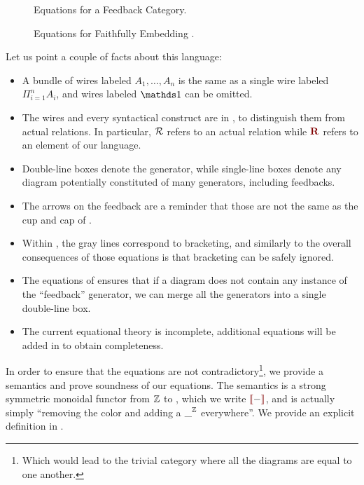 \begin{figure*}[h]
	\caption{Equations for a Feedback Category.}
	\label{appfig:graph-feedback-inf}
\end{figure*}

\begin{figure*}[h]
	\caption{Equations for Faithfully Embedding .}
	\label{appfig:graph-finrel-inf}
\end{figure*}

Let us point a couple of facts about this language:
\begin{itemize}
	\item A bundle of wires labeled $A_1,\dots,A_n$ is the same as a single wire labeled $\Pi_{i=1}^n A_i$, and wires labeled $\one$ can be omitted.
	\item The wires and every syntactical construct are in , to distinguish them from actual relations. In particular, ${\mathcal{R}}$ refers to an actual relation while $\rR$ refers to an element of our language.
	\item Double-line boxes denote the generator, while single-line boxes denote any diagram potentially constituted of many generators, including feedbacks.
	\item The arrows on the feedback are a reminder that those are not the same as the cup and cap of .
	\item Within , the gray lines correspond to bracketing, and similarly to  the overall consequences of those equations is that bracketing can be safely ignored. 
	\item The equations of  ensures that if a diagram does not contain any instance of the ``feedback'' generator, we can merge all the generators into a single double-line box.
	\item The current equational theory is incomplete, additional equations will be added in  to obtain completeness.
\end{itemize}

In order to ensure that the equations are not contradictory\footnote{Which would lead to the trivial category where all the diagrams are equal to one another.}, we provide a semantics and prove soundness of our equations. The semantics is a strong symmetric monoidal functor from ${\mathbb{Z}}$ to , which we write $\rinterp{-}$, and is actually simply ``removing the color and adding a $\_^{\mathbb{Z}}$ everywhere''. We provide an explicit definition in . 

